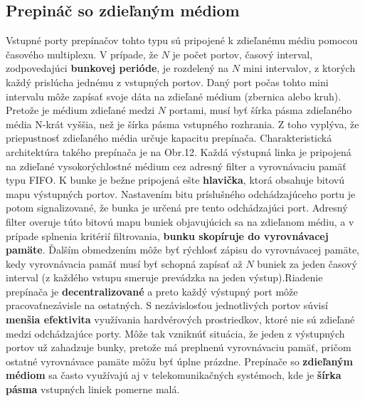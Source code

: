 \subsection{Prepináč so zdieľaným médiom}
Vstupné porty prepínačov tohto typu sú pripojené k zdieľanému médiu pomocou
časového multiplexu. V prípade, že $N$ je počet portov, časový interval, zodpovedajúci \textbf{bunkovej perióde}, je rozdelený na $N$ mini intervalov, z ktorých každý prislúcha jednému z vstupných portov. Daný port počas tohto mini intervalu môže zapísať svoje dáta na zdieľané médium (zbernica alebo kruh). Pretože je médium zdieľané medzi $N$ portami, musí byť šírka pásma zdieľaného média N-krát vyššia, než je šírka pásma vstupného rozhrania. Z toho vyplýva, že priepustnosť zdieľaného média určuje kapacitu prepínača. Charakteristická architektúra takého prepínača je na Obr.12. Každá výstupná linka je pripojená na zdieľané vysokorýchlostné médium cez adresný filter a vyrovnávaciu pamäť typu FIFO. K bunke je bežne pripojená ešte \textbf{hlavička}, ktorá obsahuje
bitovú mapu výstupných portov. Nastavením bitu príslušného odchádzajúceho portu je potom signalizované, že bunka je určená pre tento odchádzajúci port. Adresný filter overuje túto bitovú mapu buniek objavujúcich sa na zdieľanom médiu, a v prípade splnenia kritérií filtrovania, \textbf{bunku skopíruje do vyrovnávacej pamäte}. \newline
Ďalším obmedzením môže byť rýchlosť zápisu do vyrovnávacej pamäte, kedy vyrovnávacia pamäť musí byť schopná zapísať až $N$ buniek za jeden časový interval (z každého vstupu smeruje prevádzka na jeden výstup).Riadenie prepínača je \textbf{decentralizované} a preto každý výstupný port môže pracovaťnezávisle na ostatných. S nezávislosťou jednotlivých portov súvisí \textbf{menšia efektivita} využívania hardvérových prostriedkov, ktoré nie sú zdieľané medzi odchádzajúce porty. Môže tak vzniknúť situácia, že jeden z výstupných portov už zahadzuje bunky, pretože má preplnenú vyrovnávaciu pamäť, pričom ostatné vyrovnávace pamäte môžu byť úplne prázdne. Prepínače so \textbf{zdieľaným médiom} sa často využívajú aj v telekomunikačných systémoch, kde je \textbf{šírka pásma} vstupných liniek pomerne {malá}.

